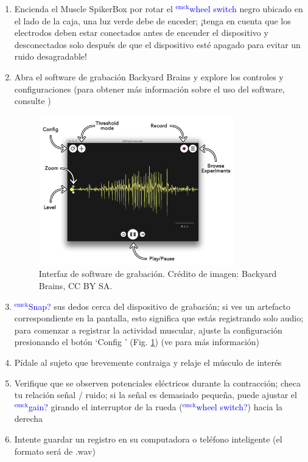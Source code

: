 \documentclass[12pt]{article}
\newcommand{\emck}[1]{\textcolor{blue}{$^{\textrm{emck}}${#1}}}
\begin{document}
\begin{enumerate}
\item Encienda el Muscle SpikerBox por rotar el \emck{wheel switch}
  negro ubicado en el lado de la caja, una luz verde debe de enceder;
  ¡tenga en cuenta que los electrodos deben estar conectados antes de
  encender el dispositivo y desconectados solo después de que el
  dispositivo esté apagado para evitar un ruido desagradable!
\item Abra el software de grabación Backyard Brains y explore los
  controles y configuraciones (para obtener más información sobre el
  uso del software, consulte \cite{spikeRecorder})

\begin{figure}[h!]
\centering
\includegraphics[width=0.8\textwidth]{figures/BBrecorder.png}
\caption{Interfaz de software de grabación. Crédito de imagen:
  Backyard Brains, CC BY SA.}
\label{fig:recorder}
\end{figure}

\item \emck{Snap?} sus dedos cerca del dispositivo de grabación; si
  ves un artefacto correspondiente en la pantalla, esto significa que
  estás registrando solo audio; para comenzar a registrar la actividad
  muscular, ajuste la configuración presionando el botón `Config '
  (Fig. \ref{fig:recorder}) (ve \cite{spikeRecorder} para más
  información)
\item Pídale al sujeto que brevemente contraiga y relaje el músculo de
  interés
\item Verifique que se observen potenciales eléctricos durante la
  contracción; checa tu relación señal / ruido; si la señal es
  demasiado pequeña, puede ajustar el \emck{gain?} girando el
  interruptor de la rueda (\emck{wheel switch?}) hacia la derecha
\item Intente guardar un registro en su computadora o teléfono
  inteligente (el formato será de .wav)
\end{enumerate}
\end{document}
